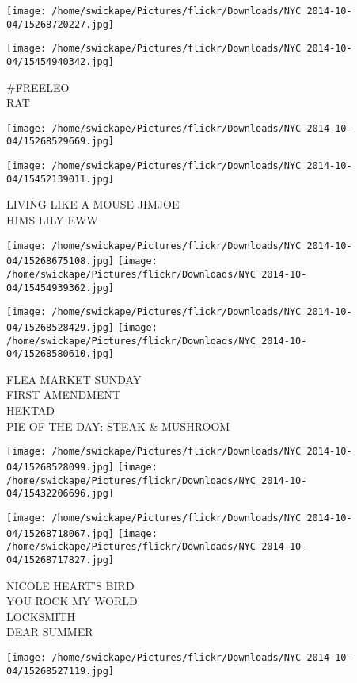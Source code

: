 \documentclass[10pt,letterpaper]{article}
\begin{document}
\texttt{[image: /home/swickape/Pictures/flickr/Downloads/NYC 2014-10-04/15268720227.jpg]}

\vspace{0.25in}
\texttt{[image: /home/swickape/Pictures/flickr/Downloads/NYC 2014-10-04/15454940342.jpg]}

\#FREELEO\\
RAT
\pagebreak

\texttt{[image: /home/swickape/Pictures/flickr/Downloads/NYC 2014-10-04/15268529669.jpg]}

\vspace{0.25in}
\texttt{[image: /home/swickape/Pictures/flickr/Downloads/NYC 2014-10-04/15452139011.jpg]}

LIVING LIKE A MOUSE JIMJOE\\
HIMS LILY EWW
\pagebreak

\texttt{[image: /home/swickape/Pictures/flickr/Downloads/NYC 2014-10-04/15268675108.jpg]}
\texttt{[image: /home/swickape/Pictures/flickr/Downloads/NYC 2014-10-04/15454939362.jpg]}

\texttt{[image: /home/swickape/Pictures/flickr/Downloads/NYC 2014-10-04/15268528429.jpg]}
\texttt{[image: /home/swickape/Pictures/flickr/Downloads/NYC 2014-10-04/15268580610.jpg]}

FLEA MARKET SUNDAY\\
FIRST AMENDMENT\\
HEKTAD\\
PIE OF THE DAY: STEAK \& MUSHROOM
\pagebreak

\texttt{[image: /home/swickape/Pictures/flickr/Downloads/NYC 2014-10-04/15268528099.jpg]}
\texttt{[image: /home/swickape/Pictures/flickr/Downloads/NYC 2014-10-04/15432206696.jpg]}

\texttt{[image: /home/swickape/Pictures/flickr/Downloads/NYC 2014-10-04/15268718067.jpg]}
\texttt{[image: /home/swickape/Pictures/flickr/Downloads/NYC 2014-10-04/15268717827.jpg]}

NICOLE HEART'S BIRD\\
YOU ROCK MY WORLD\\
LOCKSMITH\\
DEAR SUMMER
\pagebreak

\texttt{[image: /home/swickape/Pictures/flickr/Downloads/NYC 2014-10-04/15268527119.jpg]}
\end{document}

